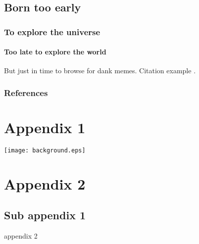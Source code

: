 \subsection{Born too early}
\begin{frame}
	\frametitle{To explore the universe}
	\framesubtitle{Too late to explore the world}
	But just in time to browse for dank memes. Citation example \cite{greenwade93}.
\end{frame}
\begin{frame}[allowframebreaks]
	\frametitle{References}
	
	
\end{frame}

\appendix
\section{Appendix 1}
\begin{frame}
	\texttt{[image: background.eps]}
\end{frame}
\section{Appendix 2}
\subsection{Sub appendix 1}
\begin{frame}
	appendix 2
\end{frame}
